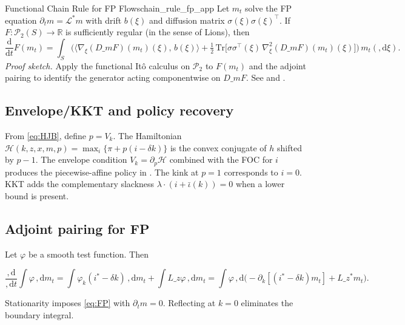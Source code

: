 ﻿\documentclass[11pt,letterpaper,oneside]{article}
\numberwithin{equation}{section}
\newcommand{\R}{\mathbb{R}}
\newcommand{\1}{\mathbf{1}}
\newcommand{\diff}{,\mathrm{d}}
\newcommand{\Lz}{L\_z}
\newcommand{\Lzadj}{L\_z^{\!*}}
\newcommand{\Dm}{D\_m}
\newcommand{\kbar}{\bar\iota}
\begin{document}
\begin{tcolorbox}[didacticstyle]
\begin{itemize}[leftmargin=1.1em,itemsep=0.25em]
\begin{lemma}{Functional Chain Rule for FP Flows}{chain_rule_fp_app}
Let $m_t$ solve the FP equation $\partial_t m = \mathcal L^{\!*} m$ with drift $b(\xi)$ and diffusion matrix $\sigma(\xi)\sigma(\xi)^\top$. If $F:\mathcal P_2(S)\to\R$ is sufficiently regular (in the sense of Lions), then
\[
\frac{\mathrm d}{\mathrm dt} F(m_t) 
= \int_S \Big( \langle \nabla_\xi (\Dm F)(m_t)(\xi),\, b(\xi) \rangle 
  + \tfrac12 \, \mathrm{Tr}\big[\sigma\sigma^\top(\xi)\, \nabla^2_\xi (\Dm F)(m_t)(\xi)\big] \Big) \, m_t(\diff \xi).
\]
\emph{Proof sketch.} Apply the functional It\^o calculus on $\mathcal P_2$ to $F(m_t)$ and the adjoint pairing to identify the generator acting componentwise on $\Dm F$. See \cite[Ch.~5]{carmona_delarue_2018_mfg} and \cite{cardaliaguet_delarue_lasry_lions_2019}.
\end{lemma}

\subsection{Envelope/KKT and policy recovery}
From \eqref{eq:HJB}, define $p=V_k$. The Hamiltonian
$\mathcal{H}(k,z,x,m,p)=\max_i\{\pi+p(i-\delta k)\}$
is the convex conjugate of $h$ shifted by $p-1$. The envelope condition $V_k=\partial_p \mathcal{H}$ combined with the FOC for $i$ produces the piecewise-affine policy in . The kink at $p=1$ corresponds to $i=0$. KKT adds the complementary slackness $\lambda\cdot(i+\kbar(k))=0$ when a lower bound is present.

\subsection{Adjoint pairing for FP}
Let $\varphi$ be a smooth test function. Then

$$
\frac{\diff}{\diff t}\int \varphi\,\diff m_t
= \int \varphi_k (i^*-\delta k)\,\diff m_t + \int \Lz \varphi\,\diff m_t
= \int \varphi\,\diff\Big(-\partial_k[(i^*-\delta k)m_t]+\Lzadj m_t\Big).
$$

Stationarity imposes \eqref{eq:FP} with $\partial_t m=0$. Reflecting at $k=0$ eliminates the boundary integral.


\end{itemize}
\end{tcolorbox}
\end{document}
